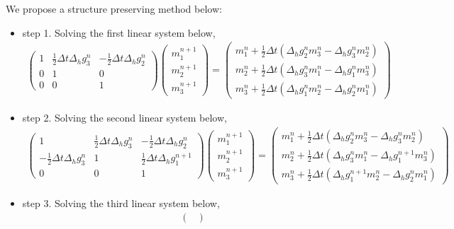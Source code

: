 \documentclass[preprint,times,3p]{elsarticle}
\begin{document}
    
    We propose a structure preserving method below:
    \begin{itemize}
        \item step 1. Solving the first linear system below,
        \begin{align*}
	\begin{pmatrix}
	1&\frac12 \Delta t \Delta_hg_3^n&-\frac12 \Delta t \Delta_hg_2^n\\
	0&1&0\\
	0&0&1
	\end{pmatrix}\begin{pmatrix}
	m_1^{n+1}\\
	m_2^{n+1}\\
	m_3^{n+1}
	\end{pmatrix}=\begin{pmatrix}
	m_1^n+\frac12 \Delta t(\Delta_hg_2^n m_3^n-\Delta_hg_3^n m_2^n)\\
	m_2^n+\frac12 \Delta t(\Delta_hg_3^n m_1^n-\Delta_hg_1^n m_3^n)\\
	m_3^n+\frac12 \Delta t(\Delta_hg_1^n m_2^n-\Delta_hg_2^n m_1^n)
	\end{pmatrix}
	\end{align*}
    \item step 2. Solving the second linear system below,
	\begin{align*}
	\begin{pmatrix}
	1&\frac12 \Delta t \Delta_hg_3^n&-\frac12 \Delta t \Delta_hg_2^n\\
	-\frac12 \Delta t\Delta_hg_3^n&1&\frac12 \Delta t\Delta_hg_1^{n+1}\\
	0&0&1
	\end{pmatrix}\begin{pmatrix}
	m_1^{n+1}\\
	m_2^{n+1}\\
	m_3^{n+1}
	\end{pmatrix}=\begin{pmatrix}
	m_1^n+\frac12 \Delta t(\Delta_hg_2^n m_3^n-\Delta_hg_3^n m_2^n)\\
	m_2^n+\frac12 \Delta t(\Delta_hg_3^n m_1^n-\Delta_hg_1^{n+1} m_3^n)\\
	m_3^n+\frac12 \Delta t(\Delta_hg_1^{n+1}m_2^n-\Delta_hg_2^n m_1^n)
	\end{pmatrix}
	\end{align*}
     \item step 3. Solving the third linear system below,
	\begin{align}\label{eq-step-3}
	\begin{pmatrix}

\end{pmatrix}
\end{align}
\end{itemize}
\end{document}
